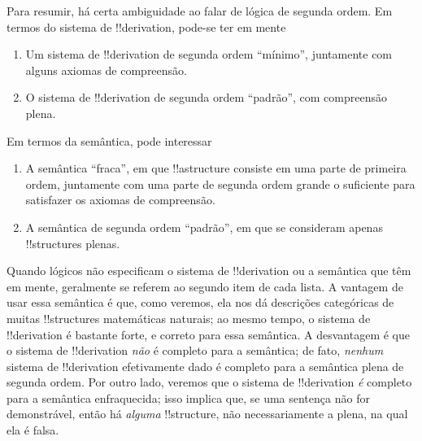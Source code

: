 \documentclass[../../../include/open-logic-section]{subfiles}
\begin{document}
Para resumir, há certa ambiguidade ao falar de lógica de segunda ordem.
Em termos do sistema de !!{derivation}, pode-se ter em mente
\begin{enumerate}
\item Um sistema de !!{derivation} de segunda ordem ``mínimo'', juntamente com alguns
  axiomas de compreensão.
\item O sistema de !!{derivation} de segunda ordem ``padrão'', com compreensão
  plena.
\end{enumerate}
Em termos da semântica, pode interessar
\begin{enumerate}
\item A semântica ``fraca'', em que !!a{structure} consiste em uma parte de primeira ordem,
  juntamente com uma parte de segunda ordem grande o suficiente para satisfazer os
  axiomas de compreensão.
\item A semântica de segunda ordem ``padrão'', em que se consideram
  apenas !!{structure}s plenas.
\end{enumerate}
Quando lógicos não especificam o sistema de !!{derivation} ou a semântica que
têm em mente, geralmente se referem ao segundo item de cada
lista. A vantagem de usar essa semântica é que, como veremos,
ela nos dá descrições categóricas de muitas !!{structure}s matemáticas naturais; ao mesmo tempo, o sistema de !!{derivation} é bastante forte, e
correto para essa semântica. A desvantagem é que o sistema de !!{derivation} \emph{não} é
completo para a semântica; de fato, \emph{nenhum} sistema de !!{derivation} efetivamente
dado é completo para a semântica plena de segunda ordem. Por
outro lado, veremos que o sistema de !!{derivation} \emph{é} completo
para a semântica enfraquecida; isso implica que, se uma sentença não for
demonstrável, então há \emph{alguma} !!{structure}, não necessariamente a
plena, na qual ela é falsa.
\end{document}
